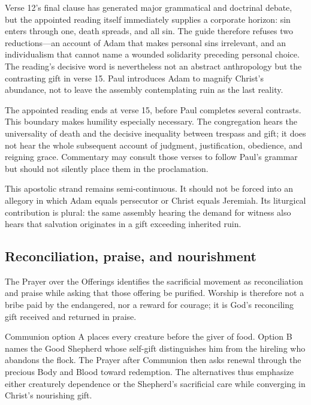 \begin{deepstudy}
Verse 12's final clause has generated major grammatical and doctrinal debate, but the appointed reading itself immediately supplies a corporate horizon: sin enters through one, death spreads, and all sin. The guide therefore refuses two reductions---an account of Adam that makes personal sins irrelevant, and an individualism that cannot name a wounded solidarity preceding personal choice. The reading's decisive word is nevertheless not an abstract anthropology but the contrasting gift in verse 15. Paul introduces Adam to magnify Christ's abundance, not to leave the assembly contemplating ruin as the last reality.

The appointed reading ends at verse 15, before Paul completes several contrasts. This boundary makes humility especially necessary. The congregation hears the universality of death and the decisive inequality between trespass and gift; it does not hear the whole subsequent account of judgment, justification, obedience, and reigning grace. Commentary may consult those verses to follow Paul's grammar but should not silently place them in the proclamation.

This apostolic strand remains semi-continuous. It should not be forced into an allegory in which Adam equals persecutor or Christ equals Jeremiah. Its liturgical contribution is plural: the same assembly hearing the demand for witness also hears that salvation originates in a gift exceeding inherited ruin.

\subsection*{Reconciliation, praise, and nourishment\enspace{}}

The Prayer over the Offerings identifies the sacrificial movement as reconciliation and praise while asking that those offering be purified. Worship is therefore not a bribe paid by the endangered, nor a reward for courage; it is God's reconciling gift received and returned in praise.

Communion option A places every creature before the giver of food. Option B names the Good Shepherd whose self-gift distinguishes him from the hireling who abandons the flock. The Prayer after Communion then asks renewal through the precious Body and Blood toward redemption. The alternatives thus emphasize either creaturely dependence or the Shepherd's sacrificial care while converging in Christ's nourishing gift.


\end{deepstudy}
